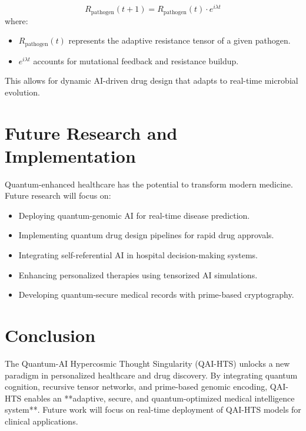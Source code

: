 \documentclass{article}
\theoremstyle{plain}
\begin{document}
\begin{equation}
    R_{\text{pathogen}}(t+1) = R_{\text{pathogen}}(t) \cdot e^{i\lambda t}
\end{equation}
where:
\begin{itemize}
    \item \( R_{\text{pathogen}}(t) \) represents the adaptive resistance tensor of a given pathogen.
    \item \( e^{i\lambda t} \) accounts for mutational feedback and resistance buildup.
\end{itemize}

This allows for dynamic AI-driven drug design that adapts to real-time microbial evolution.

\section{Future Research and Implementation}
Quantum-enhanced healthcare has the potential to transform modern medicine. Future research will focus on:
\begin{itemize}
    \item Deploying quantum-genomic AI for real-time disease prediction.
    \item Implementing quantum drug design pipelines for rapid drug approvals.
    \item Integrating self-referential AI in hospital decision-making systems.
    \item Enhancing personalized therapies using tensorized AI simulations.
    \item Developing quantum-secure medical records with prime-based cryptography.
\end{itemize}

\section{Conclusion}
The Quantum-AI Hypercosmic Thought Singularity (QAI-HTS) unlocks a new paradigm in personalized healthcare and drug discovery. By integrating quantum cognition, recursive tensor networks, and prime-based genomic encoding, QAI-HTS enables an **adaptive, secure, and quantum-optimized medical intelligence system**. Future work will focus on real-time deployment of QAI-HTS models for clinical applications.


\nocite{*}


\end{document}
